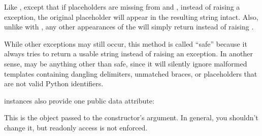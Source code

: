 \documentclass[letterpaper,10pt,english]{sphinxmanual}
\begin{document}
\begin{fulllineitems}
\begin{fulllineitems}
\label{\detokenize{string:string.Template.safe_substitute}}
Like {\hyperref[\detokenize{string:string.Template.substitute}]{}}, except that if placeholders are missing from
 and , instead of raising a  exception, the
original placeholder will appear in the resulting string intact.  Also,
unlike with {\hyperref[\detokenize{string:string.Template.substitute}]{}}, any other appearances of the \sphinxcode{\sphinxupquote{\$}} will
simply return \sphinxcode{\sphinxupquote{\$}} instead of raising .

While other exceptions may still occur, this method is called “safe”
because it always tries to return a usable string instead of
raising an exception.  In another sense, {\hyperref[\detokenize{string:string.Template.safe_substitute}]{}} may be
anything other than safe, since it will silently ignore malformed
templates containing dangling delimiters, unmatched braces, or
placeholders that are not valid Python identifiers.

\end{fulllineitems}


{\hyperref[\detokenize{string:string.Template}]{}} instances also provide one public data attribute:

\begin{fulllineitems}
\label{\detokenize{string:string.Template.template}}
This is the object passed to the constructor’s  argument.  In
general, you shouldn’t change it, but read\sphinxhyphen{}only access is not enforced.

\end{fulllineitems}


\end{fulllineitems}
\end{document}
